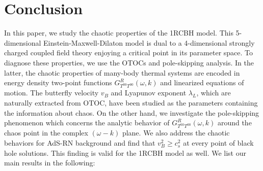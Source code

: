 \documentclass[preprintnumbers,aps,prd,longbibliography,nofootinbib,nobibnotes,amsmath,amssymb]{revtex4}
\begin{document}
\section{Conclusion}\label{sec5}
In this paper, we study the chaotic properties of the 1RCBH model. This 5-dimensional Einstein-Maxwell-Dilaton  model is dual to a 4-dimensional strongly charged coupled field theory enjoying a critical  point in its parameter space. To diagnose these properties, we use the  OTOCs and pole-skipping analysis. In the latter, the chaotic properties of many-body thermal systems are  encoded in energy density two-point functions $G^{R}_{T^{00}T^{00}}(\omega,k)$ and linearized equations of motion. The butterfly velocity $v_B$ and Lyapunov exponent $ \lambda_{L}$, which are naturally extracted from OTOC, have been studied as the parameters containing the information about chaos. On the other hand, we investigate the pole-skipping phenomenon which concerns the analytic behavior of $G^{R}_{T^{00}T^{00}}(\omega,k)$ around the chaos point  in the complex  $(\omega-k)$ plane. We also address the chaotic behaviors for AdS-RN background and find that $v_B^2 \geq c_s^2$ at every point of black hole solutions. This finding is valid for the 1RCBH model as well.
 We list our main results in the following: 
\end{document}
